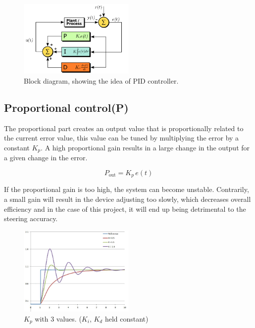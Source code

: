 \begin{figure}[h!]
  \centering
  \includegraphics[width=0.5\textwidth]{figures/PID_block.png}  
\caption{Block diagram, showing the idea of PID controller.}   
  \label{PID controller}
\end{figure}

\subsection {Proportional control(P)}

The proportional part creates an output value that is proportionally related to the current error value, this value can be tuned by multiplying the error by a constant $K_p$. A high proportional gain results in a large change in the output for a given change in the error. 


$$ P_{\mathrm{out}}=K_p\,{e(t)}$$  

If the proportional gain is too high, the system can become unstable. Contrarily, a small gain will result in the device adjusting too slowly, which decreases overall efficiency and in the case of this project, it will end up being detrimental to the steering accuracy.


\begin{figure}[h!]
  \centering
  \includegraphics[width=0.5\textwidth]{figures/PIDP.jpg}
  
  \caption{$K_p$ with 3 values. ($K_i$, $K_d$ held constant)} 
  \label{PID controller}
\end{figure}

